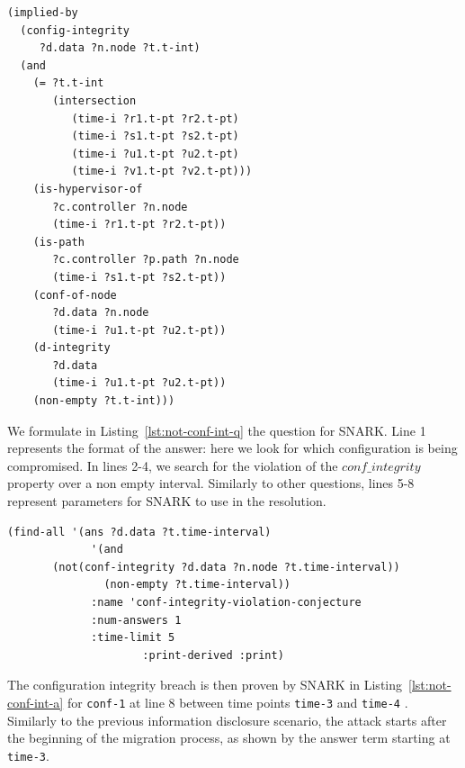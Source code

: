 \begin{lstlisting}[caption=SNARK definition of the configuration integrity., label=lst:conf-integrity-definition,captionpos=b] 
(implied-by
  (config-integrity 
     ?d.data ?n.node ?t.t-int)
  (and
    (= ?t.t-int
       (intersection
    	  (time-i ?r1.t-pt ?r2.t-pt)
    	  (time-i ?s1.t-pt ?s2.t-pt)
    	  (time-i ?u1.t-pt ?u2.t-pt)
    	  (time-i ?v1.t-pt ?v2.t-pt)))
    (is-hypervisor-of
       ?c.controller ?n.node 
       (time-i ?r1.t-pt ?r2.t-pt))
    (is-path 
	   ?c.controller ?p.path ?n.node
       (time-i ?s1.t-pt ?s2.t-pt))
    (conf-of-node
	   ?d.data ?n.node
       (time-i ?u1.t-pt ?u2.t-pt))
    (d-integrity
	   ?d.data
       (time-i ?u1.t-pt ?u2.t-pt))
    (non-empty ?t.t-int)))

\end{lstlisting}

We formulate in Listing~\ref{lst:not-conf-int-q} the question for SNARK.
Line 1 represents the format of the answer: here we look for which configuration is being compromised. In lines 2-4, we search for the violation of the $conf\_integrity$ property over a non empty interval. Similarly to other questions, lines 5-8 represent parameters for SNARK to use in the resolution.

\begin{lstlisting}[caption=SNARK question to detect the configuration integrity violation., label=lst:not-conf-int-q,captionpos=b] 
   (find-all '(ans ?d.data ?t.time-interval)
             '(and
       (not(conf-integrity ?d.data ?n.node ?t.time-interval))
               (non-empty ?t.time-interval))
             :name 'conf-integrity-violation-conjecture
             :num-answers 1
             :time-limit 5
                     :print-derived :print)
\end{lstlisting}

The configuration integrity breach is then proven by SNARK in Listing~\ref{lst:not-conf-int-a} for \verb'conf-1' at line 8 between time points \verb'time-3' and \verb'time-4' .
Similarly to the previous information disclosure scenario, the attack starts after the beginning of the migration process, as shown by the answer term starting at \verb'time-3'.


